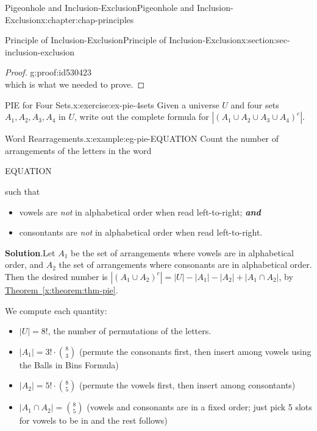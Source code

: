 \documentclass[oneside,10pt,]{book}
\newcommand{\blocktitlefont}{\relax}
\newcommand{\xreffont}{\relax}
\newcommand{\alert}[1]{\textbf{\textit{#1}}}
\numberwithin{equation}{section}
\begin{document}
\begin{chapterptx}{Pigeonhole and Inclusion-Exclusion}{}{Pigeonhole and Inclusion-Exclusion}{}{}{x:chapter:chap-principles}
\begin{sectionptx}{Principle of Inclusion-Exclusion}{}{Principle of Inclusion-Exclusion}{}{}{x:section:sec-inclusion-exclusion}
\begin{proof}{}{g:proof:id530423}
\begin{equation*}
\end{equation*}
which is what we needed to prove.%
\end{proof}
\begin{inlineexercise}{PIE for Four Sets.}{x:exercise:ex-pie-4sets}%
Given a universe \(U\) and four sets \(A_1, A_2, A_3, A_4\) in \(U\), write out the complete formula for \(|(A_1 \cup A_2 \cup A_3 \cup A_4)^c|\).%
\end{inlineexercise}%
\begin{example}{Word Rearragements.}{x:example:eg-pie-EQUATION}%
Count the number of arrangements of the letters in the word%
\begin{sidebyside}{1}{0.425}{0.425}{0}%
\begin{sbspanel}{0.15}%
EQUATION%
\end{sbspanel}%
\end{sidebyside}%
\par
such that%
\begin{itemize}[label=\textbullet]
\item{}vowels are \emph{not} in alphabetical order when read left-to-right; \alert{and}%
\item{}consontants are \emph{not} in alphabetical order when read left-to-right.%
\end{itemize}
%
\par\smallskip%
\noindent\textbf{\blocktitlefont Solution}.\hypertarget{g:solution:id531146}{}\quad{}Let \(A_1\) be the set of arrangements where vowels are in alphabetical order, and \(A_2\) the set of arrangements where consonants are in alphabetical order. Then the desired number is \(|(A_1 \cup A_2)^c| = |U| - |A_1| - |A_2| + |A_1 \cap A_2|\), by \hyperref[x:theorem:thm-pie]{Theorem~{\xreffont\ref{x:theorem:thm-pie}}}.%
\par
We compute each quantity:%
\begin{itemize}[label=\textbullet]
\item{}\(|U| = 8!\), the number of permutations of the letters.%
\item{}\(|A_1| = 3! \cdot \binom{8}{3}\) (permute the consonants first, then insert among vowels using the Balls in Bins Formula)%
\item{}\(|A_2| = 5! \cdot \binom{8}{5}\) (permute the vowels first, then insert among consontants)%
\item{}\(|A_1 \cap A_2| = \binom{8}{5}\) (vowels and consonants are in a fixed order; just pick 5 slots for vowels to be in and the rest follows)%
\end{itemize}

\end{example}
\end{sectionptx}
\end{chapterptx}
\end{document}
